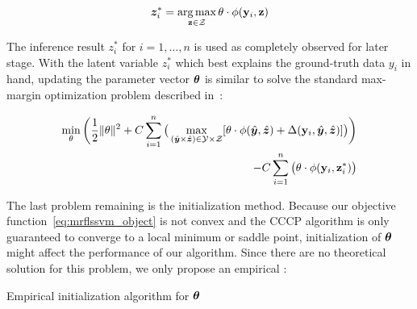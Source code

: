 \begin{align}
  {\bm{z}}_i^*=\operatorname*{arg\,max}_{\mathbf{z} \in \mathcal{Z}} \theta \cdot
  \phi(\mathbf{y}_i,\mathbf{z})
\end{align}

The inference result $z_i^*$ for $i=1,\dots,n$ is used as
completely observed for later stage. With the latent variable
$z_i^*$ which best explains the ground-truth data $y_i$ in hand,
updating the parameter vector ${\bm{\theta}}$ is similar to solve the
standard max-margin optimization problem described
in~\cite{gouldlearning}:

\begin{align}
\label{eq:mrflssvm_object}
  \min_\theta\bigg(\frac{1}{2}\|\theta\|^2+
  C\sum_{i=1}^{n}\big(\max_{(\hat{{\bm{y}}} \times
  \hat{{\bm{z}}}) \in \mathcal{Y} \times \mathcal{Z}}
  [\theta\cdot\phi(\hat{{\bm{y}}},\hat{{\bm{z}}}) +
  \Delta(\mathbf{y}_i,\hat{{\bm{y}}},\hat{{\bm{z}}})]\big)\bigg)\\
  -C\sum_{i=1}^{n}\big(\theta \cdot
  \phi(\mathbf{y}_i,\mathbf{z}_i^*)\big) \nonumber
\end{align}

The last problem remaining is the initialization method. Because
our objective function~\eqref{eq:mrflssvm_object} is not convex
and the CCCP algorithm is only guaranteed to converge to a local
minimum or saddle point\cite{yuille2002concave}, initialization
of ${\bm{\theta}}$ might affect the performance of our algorithm. Since
there are no theoretical solution for this problem, we only
propose an empirical :

\begin{algorithm}[ht]
  \begin{algorithmic}[1]
       
    \ENDIF
    \ENDFOR
     
  \end{algorithmic}
  \caption{\label{alg:init_theta} Empirical initialization
    algorithm for ${\bm{\theta}}$}
\end{algorithm}

